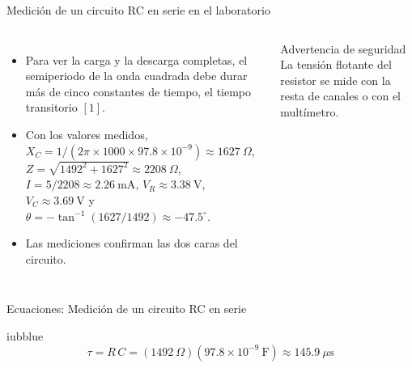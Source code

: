 \documentclass[aspectratio=169,11pt,xcolor={table}]{beamer}
\begin{document}
\begin{frame}{{\normalsize Medición de un circuito RC en serie en el laboratorio}}
\begin{columns}[c,onlytextwidth]
\small
\begin{itemize}\setlength{\itemsep}{4pt}
  \item Para ver la carga y la descarga completas, el semiperiodo de la onda cuadrada debe durar más de cinco constantes de tiempo, el tiempo transitorio $[1]$.
  \item Con los valores medidos, $X_C = 1/(2\pi \times 1000 \times 97.8 \times 10^{-9}) \approx 1627\ \Omega$, $Z = \sqrt{1492^2 + 1627^2} \approx 2208\ \Omega$, $I = 5 / 2208 \approx 2.26\ \text{mA}$, $V_R \approx 3.38\ \text{V}$, $V_C \approx 3.69\ \text{V}$ y $\theta = -\tan^{-1}(1627/1492) \approx -47.5^\circ$.
  \item Las mediciones confirman las dos caras del circuito.
\end{itemize}
\begin{cardO}{Advertencia de seguridad}
\footnotesize La tensión flotante del resistor se mide con la resta de canales o con el multímetro.
\end{cardO}
\end{columns}
\end{frame}

\begin{frame}{Ecuaciones: Medición de un circuito RC en serie}
\begin{cajaplana}{iubblue}
\centering
{\large
\begin{equation*}
  \tau = R\,C = (1492\ \Omega)(97.8 \times 10^{-9}\ \text{F}) \approx 145.9\ \mu\text{s}
\end{equation*}
}
\end{cajaplana}
\end{frame}
\end{document}
